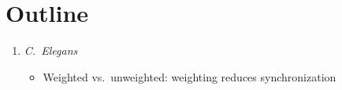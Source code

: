 \documentclass{article}
\begin{document}
\section{Outline}
\begin{enumerate}
  \item \emph{C.\ Elegans}
  \begin{itemize}
    \item Weighted vs.\ unweighted: weighting reduces synchronization
  \end{itemize}
\end{enumerate}
\end{document}
